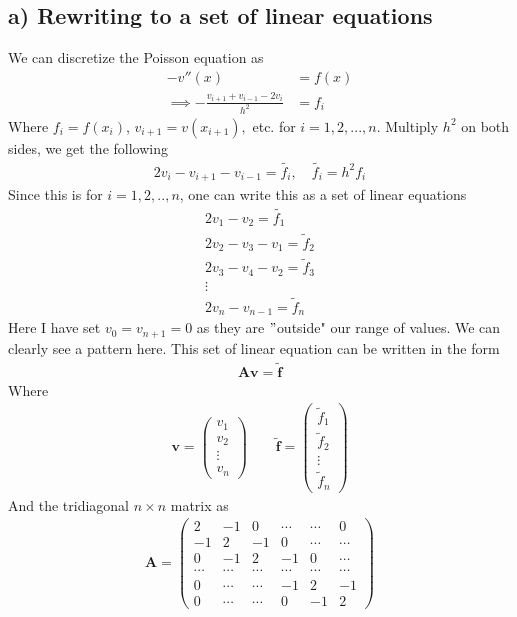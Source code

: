 \documentclass[12pt]{article}
\begin{document}
\subsection*{a) Rewriting to a set of linear equations}
We can discretize the Poisson equation as
\begin{align}
-v''(x) &= f(x)\\ \nonumber
\implies -\frac{v_{i+1} + v_{i-1} - 2v_i}{h^2} &= f_i
\end{align}
Where $f_i = f(x_i)$, $v_{i+1}=v(x_{i+1}),$ etc. for $i=1,2,...,n$. Multiply $h^2$ on both sides, we get the following
\begin{align}
2v_i - v_{i+1} - v_{i-1} = \tilde{f_i}, \quad \tilde{f_i} = h^2f_i
\end{align}
Since this is for $i = 1,2,..,n$, one can write this as a set of linear equations
\begin{align}
2v_1 - v_2 = \tilde{f_1} \nonumber \\ 
2v_2 - v_3 - v_1 = \tilde{f}_2 \nonumber \\
2v_3 - v_4 - v_2 = \tilde{f}_3 \nonumber \\
\vdots \nonumber \\
2v_n - v_{n-1} = \tilde{f}_n
\end{align}
Here I have set $v_0 = v_{n+1} = 0$ as they are $"$outside" our range of values. We can clearly see a pattern here. This set of linear equation can be written in the form
\begin{align}
\mathbf{A}\mathbf{v} = \mathbf{\tilde{f}}
\end{align}
Where
\begin{align}
\mathbf{v} = 
\begin{pmatrix}
v_1 \\
v_2 \\
\vdots \\
v_n
\end{pmatrix}
\qquad
\mathbf{\tilde{f}} =
\begin{pmatrix}
\tilde{f}_1\\
\tilde{f}_2\\
\vdots \\
\tilde{f}_n
\end{pmatrix}
\end{align}
And the tridiagonal $n \times n$ matrix as
\begin{align}
\mathbf{A} =
\begin{pmatrix}
2 & -1 & 0 & \cdots & \cdots & 0 \\
-1 & 2 & -1 & 0 & \cdots & \cdots \\
0 & -1 & 2 & -1 & 0 & \cdots \\
\cdots & \cdots & \cdots & \cdots & \cdots & \cdots \\
0 & \cdots & \cdots & -1 & 2 & -1 \\
0 & \cdots & \cdots & 0 & -1 & 2
\end{pmatrix}
\end{align}
\end{document}
